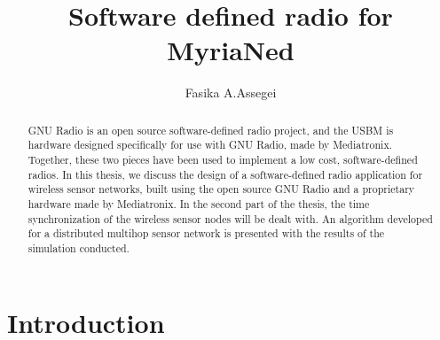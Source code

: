 \documentclass[a4paper,10pt]{article}
\title{Software defined radio for MyriaNed}
\author{Fasika A.Assegei}
\begin{document}
\maketitle
\newpage
\begin{abstract}
GNU Radio is an open source software-defined radio project, and the
USBM is hardware designed specifically for use with GNU Radio, made
by Mediatronix. Together, these two pieces have been used to
implement a low cost, software-defined radios. In this thesis, we
discuss the design of a software-defined radio application for
wireless sensor networks, built using the open source GNU Radio and
a proprietary hardware made by Mediatronix.
\newline
In the second part of the thesis, the time synchronization of the
wireless sensor nodes will be dealt with. An algorithm developed for
a distributed multihop sensor network is presented with the results
of the simulation conducted.
\end{abstract}
\newpage
\tableofcontents
\newpage
\section{Introduction}
\newpage
\end{document}
